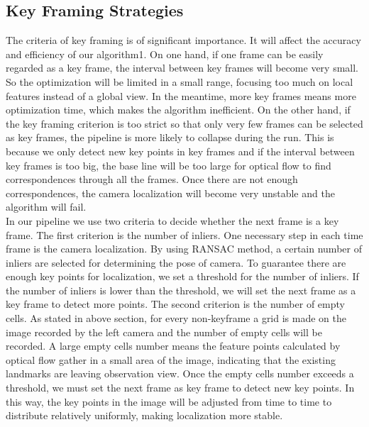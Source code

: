 \documentclass{easychair}
\begin{document}

\subsection{Key Framing Strategies}
The criteria of key framing is of significant importance. It will affect the accuracy and efficiency of our algorithm1. On one hand, if one frame can be easily regarded as a key frame, the interval between key frames will become very small. So the optimization will be limited in a small range, focusing too much on local features instead of a global view. In the meantime, more key frames means more optimization time, which makes the algorithm inefficient. On the other hand, if the key framing criterion is too strict so that only very few frames can be selected as key frames, the pipeline is more likely to collapse during the run. This is because we only detect new key points in key frames and if the interval between key frames is too big, the base line will be too large for optical flow to find correspondences through all the frames. Once there are not enough correspondences, the camera localization will become very unstable and the algorithm will fail.\\

In our pipeline we use two criteria to decide whether the next frame is a key frame. The first criterion is the number of inliers. One necessary step in each time frame is the camera localization. By using RANSAC method, a certain number of inliers are selected for determining the pose of camera. To guarantee there are enough key points for localization, we set a threshold for the number of inliers. If the number of inliers is lower than the threshold, we will set the next frame as a key frame to detect more points. The second criterion is the number of empty cells. As stated in above section, for every non-keyframe a grid is made on the image recorded by the left camera and the number of empty cells will be recorded. A large empty cells number means the feature points calculated by optical flow gather in a small area of the image, indicating that the existing landmarks are leaving observation view. Once the empty cells number exceeds a threshold, we must set the next frame as key frame to detect new key points. In this way, the key points in the image will be adjusted from time to time to distribute relatively uniformly, making localization more stable.
\end{document}
